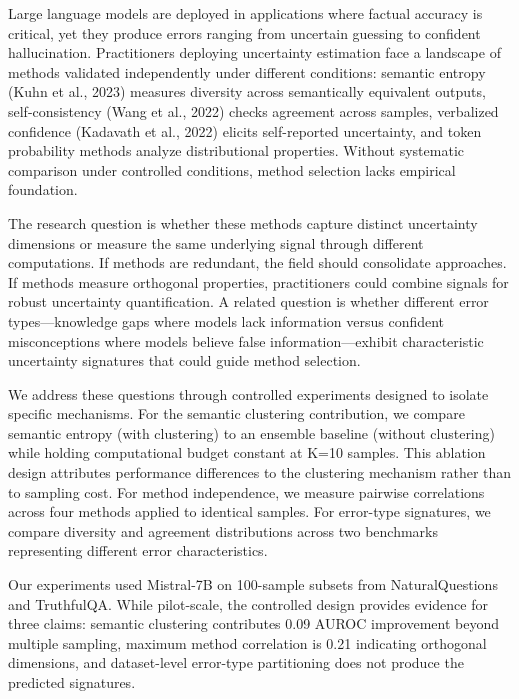 
Large language models are deployed in applications where factual accuracy is critical, yet they produce errors ranging from uncertain guessing to confident hallucination. Practitioners deploying uncertainty estimation face a landscape of methods validated independently under different conditions: semantic entropy (Kuhn et al., 2023) measures diversity across semantically equivalent outputs, self-consistency (Wang et al., 2022) checks agreement across samples, verbalized confidence (Kadavath et al., 2022) elicits self-reported uncertainty, and token probability methods analyze distributional properties. Without systematic comparison under controlled conditions, method selection lacks empirical foundation.

The research question is whether these methods capture distinct uncertainty dimensions or measure the same underlying signal through different computations. If methods are redundant, the field should consolidate approaches. If methods measure orthogonal properties, practitioners could combine signals for robust uncertainty quantification. A related question is whether different error types—knowledge gaps where models lack information versus confident misconceptions where models believe false information—exhibit characteristic uncertainty signatures that could guide method selection.

We address these questions through controlled experiments designed to isolate specific mechanisms. For the semantic clustering contribution, we compare semantic entropy (with clustering) to an ensemble baseline (without clustering) while holding computational budget constant at K=10 samples. This ablation design attributes performance differences to the clustering mechanism rather than to sampling cost. For method independence, we measure pairwise correlations across four methods applied to identical samples. For error-type signatures, we compare diversity and agreement distributions across two benchmarks representing different error characteristics.

Our experiments used Mistral-7B on 100-sample subsets from NaturalQuestions and TruthfulQA. While pilot-scale, the controlled design provides evidence for three claims: semantic clustering contributes 0.09 AUROC improvement beyond multiple sampling, maximum method correlation is 0.21 indicating orthogonal dimensions, and dataset-level error-type partitioning does not produce the predicted signatures.
